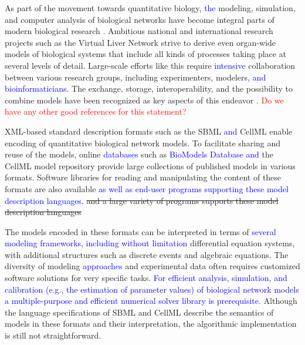 \documentclass[10pt]{bmc_article}
\newenvironment{bmcformat}{\fussy\setboolean{publ}{true}}{\fussy}
\newcommand{\COR}[1]                      {\textcolor{blue}{#1}}
\newcommand{\TODO}[1]                     {\textcolor{red}{#1}}
\begin{document}
\begin{bmcformat}
As part of the movement towards quantitative biology, \COR{the} modeling, 
simulation, and computer analysis of biological networks have become integral
parts of modern biological research \cite{Macilwain2011}.
Ambitious national and international research projects such as the Virtual Liver
Network \cite{Holzhuetter2012} strive to derive even organ-wide models of
biological systems that include all kinds of processes taking place at several
levels of detail.
Large-scale efforts like this require \COR{intensive} collaboration between various
research groups, including experimenters\COR{,} modelers\COR{, and bioinformaticians}.
The exchange, storage, interoperability\COR{,} and the possibility to combine models have been recognized as
key aspects of this endeavor \cite{Liebermeister2009sta}.
\TODO{Do we have any other good references for this statement?}

XML-based standard description formats \cite{Bray2000} such as the
\acf{SBML} \cite{Hucka2004} \COR{and} CellML \cite{Lloyd2004}
enable encoding of quantitative biological network models.
To facilitate sharing and reuse of the models, online \COR{databases} such as
\COR{BioModels Database} \cite{Li2010a} \COR{and} the CellML model repository
\cite{Lloyd2008} provide large collections of published models in various
formats.
Software libraries for reading and manipulating the content
of these formats are also available \cite{Bornstein2008, Miller2010,
Draeger2011b}
\COR{as well as end-user programs supporting these model description languages.}
\sout{and a large variety of programs supports these model description languages}

The models encoded in these formats can be interpreted in terms of 
\COR{several modeling frameworks, including without limitation}
differential equation systems, with additional structures such as
discrete events and algebraic equations.
The diversity of modeling \COR{approaches} and experimental data often requires
customized software solutions for very specific tasks.
\COR{For efficient analysis, simulation, and calibration (e.g.,
the estimation of parameter values) of biological network models a
multiple-purpose and efficient numerical solver library is prerequisite.}
Although the language specifications of \acs{SBML} \cite{Hucka2001, Hucka2003,
Finney2003a, Finney2006, Hucka2007, Hucka2008, Hucka2010a} 
and CellML \cite{Cuellar2006} describe the semantics of models in these formats
and their interpretation, the algorithmic implementation is still not
straightforward.


\end{bmcformat}
\end{document}
